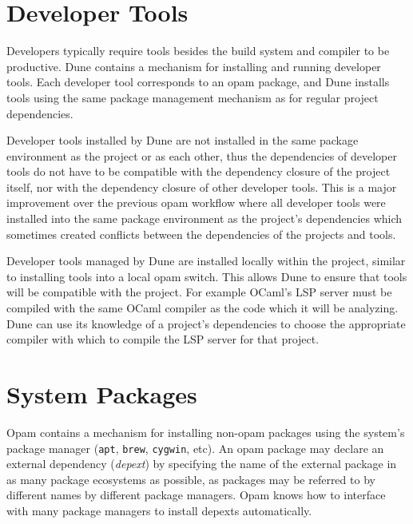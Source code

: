 \documentclass{article}
\begin{document}
\begin{multicols}{2}
        \section {Developer Tools}

        Developers typically require tools besides the build system and compiler
        to be productive. Dune contains a mechanism for installing and running
        developer tools. Each developer tool corresponds to an opam package, and
        Dune installs tools using the same package management mechanism as for
        regular project dependencies.

        Developer tools installed by Dune are not installed in the same
        package environment as the project or as each other, thus the dependencies
        of developer tools do not have to be compatible with the dependency
        closure of the project itself, nor with the dependency closure of other
        developer tools. This is a major improvement over the previous opam
        workflow where all developer tools were installed into the same package
        environment as the project's dependencies which sometimes created
        conflicts between the dependencies of the projects and tools.

        Developer tools managed by Dune are installed locally within the
        project, similar to installing tools into a local opam switch. This
        allows Dune to ensure that tools will be compatible with the project.
        For example OCaml's LSP server must be compiled with the same OCaml
        compiler as the code which it will be analyzing. Dune can use its
        knowledge of a project's dependencies to choose the appropriate compiler
        with which to compile the LSP server for that project.

        \section {System Packages}

        Opam contains a mechanism for installing non-opam packages using the
        system's package manager (\texttt{apt}, \texttt{brew}, \texttt{cygwin},
        etc). An opam package may declare an external dependency
        (\textit{depext}) by specifying the name of the external package in as
        many package ecosystems as possible, as packages may be referred to by
        different names by different package managers. Opam knows how to
        interface with many package managers to install depexts automatically.


\end{multicols}
\end{document}
